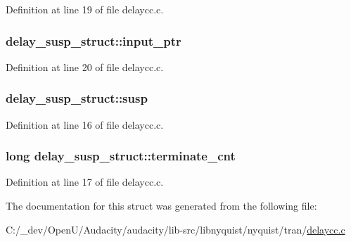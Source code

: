 Definition at line 19 of file delaycc.\+c.

\subsubsection[{\texorpdfstring{input\+\_\+ptr}{input_ptr}}]{ delay\+\_\+susp\+\_\+struct\+::input\+\_\+ptr}\hypertarget{structdelay__susp__struct_a1284a8b44186da846294df8c82e1d7a1}{}\label{structdelay__susp__struct_a1284a8b44186da846294df8c82e1d7a1}


Definition at line 20 of file delaycc.\+c.

\subsubsection[{\texorpdfstring{susp}{susp}}]{ delay\+\_\+susp\+\_\+struct\+::susp}\hypertarget{structdelay__susp__struct_ae01a96827e63900ea74e1fd1656f7555}{}\label{structdelay__susp__struct_ae01a96827e63900ea74e1fd1656f7555}


Definition at line 16 of file delaycc.\+c.

\subsubsection[{\texorpdfstring{terminate\+\_\+cnt}{terminate_cnt}}]{\setlength{\rightskip}{0pt plus 5cm}long delay\+\_\+susp\+\_\+struct\+::terminate\+\_\+cnt}\hypertarget{structdelay__susp__struct_ae2c6aa034cfa2eaf1eac74fc77bd49b8}{}\label{structdelay__susp__struct_ae2c6aa034cfa2eaf1eac74fc77bd49b8}


Definition at line 17 of file delaycc.\+c.



The documentation for this struct was generated from the following file\+:\begin{DoxyCompactItemize}
\item 
C\+:/\+\_\+dev/\+Open\+U/\+Audacity/audacity/lib-\/src/libnyquist/nyquist/tran/\hyperlink{delaycc_8c}{delaycc.\+c}\end{DoxyCompactItemize}
